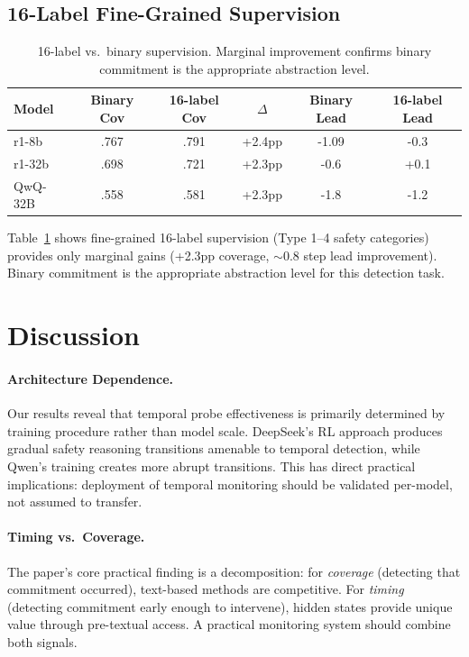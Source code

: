 \documentclass[11pt,a4paper]{article}
\begin{document}
\subsection{16-Label Fine-Grained Supervision}

\begin{table}[t]
\centering
\small
\begin{tabular}{lccccc}
\toprule
Model & Binary Cov & 16-label Cov & $\Delta$ & Binary Lead & 16-label Lead \\
\midrule
r1-8b & .767 & .791 & +2.4pp & -1.09 & -0.3 \\
r1-32b & .698 & .721 & +2.3pp & -0.6 & +0.1 \\
QwQ-32B & .558 & .581 & +2.3pp & -1.8 & -1.2 \\
\bottomrule
\end{tabular}
\caption{16-label vs.\ binary supervision. Marginal improvement confirms binary commitment is the appropriate abstraction level.}
\label{tab:16label}
\end{table}

Table~\ref{tab:16label} shows fine-grained 16-label supervision (Type 1--4 safety categories) provides only marginal gains (+2.3pp coverage, $\sim$0.8 step lead improvement). Binary commitment is the appropriate abstraction level for this detection task.

\section{Discussion}

\paragraph{Architecture Dependence.} Our results reveal that temporal probe effectiveness is primarily determined by training procedure rather than model scale. DeepSeek's RL approach produces gradual safety reasoning transitions amenable to temporal detection, while Qwen's training creates more abrupt transitions. This has direct practical implications: deployment of temporal monitoring should be validated per-model, not assumed to transfer.

\paragraph{Timing vs.\ Coverage.} The paper's core practical finding is a decomposition: for \emph{coverage} (detecting that commitment occurred), text-based methods are competitive. For \emph{timing} (detecting commitment early enough to intervene), hidden states provide unique value through pre-textual access. A practical monitoring system should combine both signals.
\end{document}
